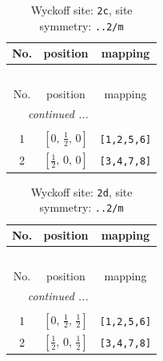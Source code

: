 \documentclass[fleqn,8pt]{jsarticle}
\begin{document}
\renewcommand{\arraystretch}{1.2}
\begin{longtable}{ccc}
\caption{Wyckoff site: {\tt 2c}, site symmetry: {\tt ..2/m}}
 \\
 \hline \hline
No. & position & mapping \\ \hline \endfirsthead

\multicolumn{2}{l}{\tablename\ \thetable{}} \\
 \hline \hline
No. & position & mapping \\ \hline \endhead

 \hline \hline
\multicolumn{2}{r}{\footnotesize\it continued ...} \\ \endfoot

 \hline \hline
\multicolumn{2}{r}{} \\ \endlastfoot

1 & $\left[ 0,\, \frac{1}{2},\, 0 \right]$ & {\tt [1,2,5,6]} \\ \hline
2 & $\left[ \frac{1}{2},\, 0,\, 0 \right]$ & {\tt [3,4,7,8]} \\
\end{longtable}
\renewcommand{\arraystretch}{1.2}
\begin{longtable}{ccc}
\caption{Wyckoff site: {\tt 2d}, site symmetry: {\tt ..2/m}}
 \\
 \hline \hline
No. & position & mapping \\ \hline \endfirsthead

\multicolumn{2}{l}{\tablename\ \thetable{}} \\
 \hline \hline
No. & position & mapping \\ \hline \endhead

 \hline \hline
\multicolumn{2}{r}{\footnotesize\it continued ...} \\ \endfoot

 \hline \hline
\multicolumn{2}{r}{} \\ \endlastfoot

1 & $\left[ 0,\, \frac{1}{2},\, \frac{1}{2} \right]$ & {\tt [1,2,5,6]} \\ \hline
2 & $\left[ \frac{1}{2},\, 0,\, \frac{1}{2} \right]$ & {\tt [3,4,7,8]} \\
\end{longtable}
\renewcommand{\arraystretch}{1.2}
\end{document}
